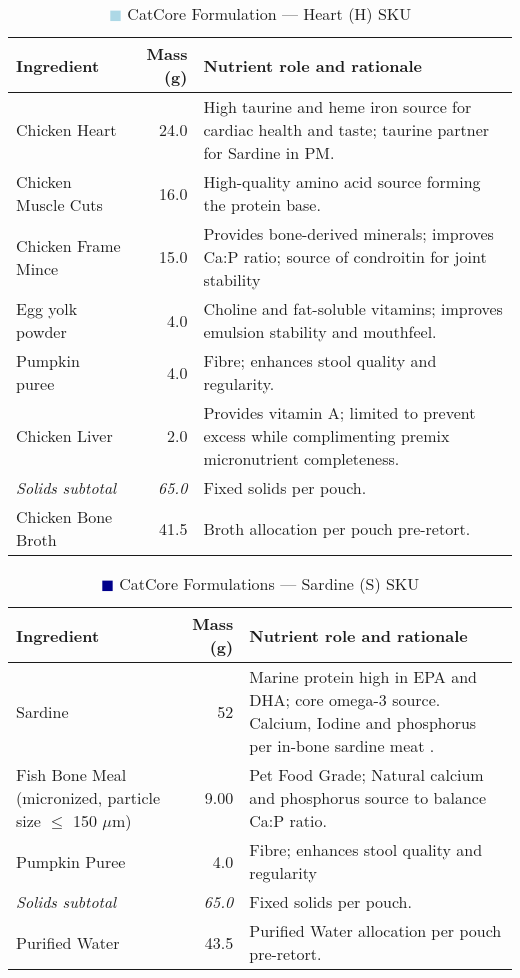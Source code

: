 \begin{table}[htbp]
\centering
\caption{\textcolor{lightblue}{$\blacksquare$} CatCore Formulation ---  Heart (H) SKU}
\label{tab:heart_sku_3col}
\begin{adjustbox}{max width=\textwidth}
\begin{tabular}{@{}l r p{8.0cm}@{}}
\toprule
\textbf{Ingredient} & \textbf{Mass (g)} & \textbf{Nutrient role and rationale} \\
\midrule
Chicken Heart & 24.0 & High taurine and heme iron source for cardiac health and taste; taurine partner for Sardine in PM. \\[3pt]
Chicken Muscle Cuts & 16.0 & High-quality amino acid source forming the protein base. \\[3pt]
Chicken Frame Mince & 15.0 & Provides bone-derived minerals; improves Ca:P ratio; source of condroitin for joint stability \\[3pt]
Egg yolk powder & 4.0 & Choline and fat-soluble vitamins; improves emulsion stability and mouthfeel. \\[3pt]
Pumpkin puree & 4.0 & Fibre; enhances stool quality and regularity. \\[3pt]
Chicken Liver & 2.0 & Provides vitamin A; limited to prevent excess while complimenting premix micronutrient completeness. \\[3pt]
\textit{Solids subtotal} & \textit{65.0} & Fixed solids per pouch. \\[3pt]
Chicken Bone Broth & 41.5 & Broth allocation per pouch pre-retort. \\[3pt]
\bottomrule
\end{tabular}
\end{adjustbox}
\end{table}

\begin{table}[htbp]
\centering
\caption{\textcolor{darkblue}{$\blacksquare$} CatCore Formulations --- Sardine (S) SKU}
\label{tab:sardine_sku_3col_mod}
\begin{adjustbox}{max width=\textwidth}
\begin{tabular}{@{}l r p{8.0cm}@{}}
\toprule
\textbf{Ingredient} & \textbf{Mass (g)} & \textbf{Nutrient role and rationale} \\
\midrule
Sardine & 52 & Marine protein high in EPA and DHA; core omega-3 source. Calcium, Iodine and phosphorus per in-bone sardine meat \cite{sardinecap}. \\[3pt]
Fish Bone Meal (micronized, particle size $\le$ 150 $\mu$m) & 9.00 & Pet Food Grade; Natural calcium and phosphorus source to balance Ca:P ratio. \\[3pt]
Pumpkin Puree & 4.0 & Fibre; enhances stool quality and regularity \\[3pt]
\textit{Solids subtotal} & \textit{65.0} & Fixed solids per pouch. \\[3pt]
Purified Water & 43.5 & Purified Water allocation per pouch pre-retort. \\[3pt]
\bottomrule
\end{tabular}
\end{adjustbox}
\end{table}

